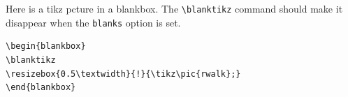 \documentclass{article}
\theoremstyle{definition}
\begin{document}
Here is a tikz pcture in a blankbox. The \verb+\blanktikz+ command should make it disappear when the {\tt blanks} option is set.
\begin{Verbatim}[frame=single]
\begin{blankbox}
\blanktikz
\resizebox{0.5\textwidth}{!}{\tikz\pic{rwalk};}
\end{blankbox}
\end{Verbatim}

\begin{blankbox}
\blanktikz
{}
\end{blankbox}
%

\end{document}
